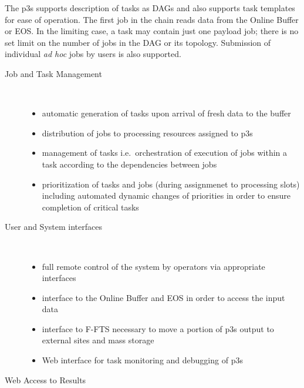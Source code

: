 \documentclass[pdftex,12pt,letter]{article}
\begin{document}
The p3s supports description of tasks as DAGs and also supports task templates
for ease of operation. The first job in the chain reads data from
the Online Buffer or EOS. In the limiting case, a task may contain just one payload
job; there is no set limit on the number of jobs in the DAG or its topology.
Submission of individual \textit{ad hoc} jobs by users is also supported.

\begin{description}
\item[Job and Task Management]\ 
\begin{itemize}

\item automatic generation of tasks upon arrival of fresh data to the buffer

\item distribution of jobs to processing resources assigned to p3s

\item management of tasks i.e.~orchestration of execution of jobs within
a task according to the dependencies between jobs

\item prioritization of tasks and jobs (during assignmenet to processing slots)
 including automated dynamic changes of priorities in order to ensure completion
of critical tasks

\end{itemize} 

\item[User and System interfaces]\ 
\begin{itemize}

\item full remote control of the system by operators via appropriate interfaces

\item interface to the Online Buffer and EOS in order to access the input data

\item interface to F-FTS necessary to move a portion of p3s output to external
sites and mass storage

\item Web interface for task monitoring and debugging of p3s


\end{itemize} 

\item[Web Access to Results]\ 
\begin{itemize}


\end{itemize}
\end{description}
\end{document}
